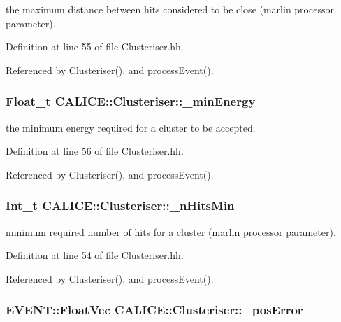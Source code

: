 the maximum distance between hits considered to be close (marlin processor parameter). 

Definition at line 55 of file Clusteriser.hh.

Referenced by Clusteriser(), and processEvent().
\subsubsection[{\_\-minEnergy}]{\setlength{\rightskip}{0pt plus 5cm}Float\_\-t {\bf CALICE::Clusteriser::\_\-minEnergy}\hspace{0.3cm}{\ttfamily  [protected]}}\label{classCALICE_1_1Clusteriser_adddac3244a642b766585fdb7653b2f16}


the minimum energy required for a cluster to be accepted. 

Definition at line 56 of file Clusteriser.hh.

Referenced by Clusteriser(), and processEvent().
\subsubsection[{\_\-nHitsMin}]{\setlength{\rightskip}{0pt plus 5cm}Int\_\-t {\bf CALICE::Clusteriser::\_\-nHitsMin}\hspace{0.3cm}{\ttfamily  [protected]}}\label{classCALICE_1_1Clusteriser_a5451dad61f977c6de41a25739c6fb97c}


minimum required number of hits for a cluster (marlin processor parameter). 

Definition at line 54 of file Clusteriser.hh.

Referenced by Clusteriser(), and processEvent().
\subsubsection[{\_\-posError}]{\setlength{\rightskip}{0pt plus 5cm}EVENT::FloatVec {\bf CALICE::Clusteriser::\_\-posError}\hspace{0.3cm}{\ttfamily  [protected]}}\label{classCALICE_1_1Clusteriser_a02ac68c99c5bc9a3bb259cde379316d5}


